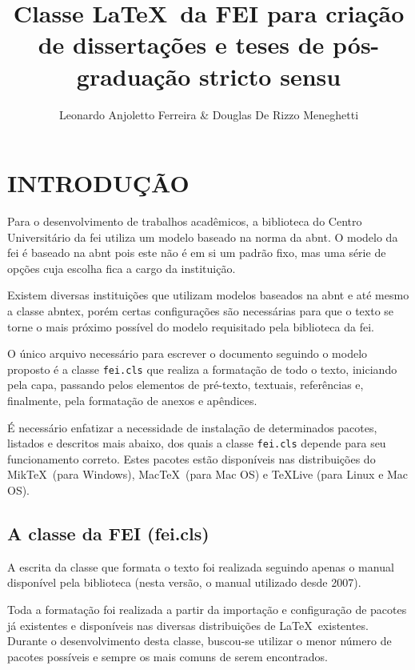 \documentclass{fei}
\author{Leonardo Anjoletto Ferreira \& Douglas De Rizzo Meneghetti}
\title{Classe \LaTeX~da FEI para criação de dissertações e teses de pós-graduação stricto sensu}
\begin{document}

\maketitle
\printglossaries
\sumario

\chapter{INTRODUÇÃO}

Para o desenvolvimento de trabalhos acadêmicos, a biblioteca do Centro Universitário da \gls{fei} utiliza um modelo baseado na norma da \gls{abnt}. O modelo da \gls{fei} é baseado na \gls{abnt} pois este não é em si um padrão fixo, mas uma série de opções cuja escolha fica a cargo da instituição.

Existem diversas instituições que utilizam modelos baseados na \gls{abnt} e até mesmo a classe \gls{abntex}, porém certas configurações são necessárias para que o texto se torne o mais próximo possível do modelo requisitado pela biblioteca da \gls{fei}.

O único arquivo necessário para escrever o documento seguindo o modelo proposto é a classe \texttt{fei.cls} que realiza a formatação de todo o texto, iniciando pela capa, passando pelos elementos de pré-texto, textuais, referências e, finalmente, pela formatação de anexos e apêndices.

É necessário enfatizar a necessidade de instalação de determinados pacotes, listados e descritos mais abaixo, dos quais a classe \texttt{fei.cls} depende para seu funcionamento correto. Estes pacotes estão disponíveis nas distribuições do Mik\TeX~(para Windows), Mac\TeX~(para Mac OS) e \TeX Live (para Linux e Mac OS).

\section{A classe da FEI (fei.cls)}

A escrita da classe que formata o texto foi realizada seguindo apenas o manual disponível pela biblioteca (nesta versão, o manual utilizado desde 2007).

Toda a formatação foi realizada a partir da importação e configuração de pacotes já existentes e disponíveis nas diversas distribuições de \index{\LaTeX}\LaTeX~existentes. Durante o desenvolvimento desta classe, buscou-se utilizar o menor número de pacotes possíveis e sempre os mais comuns de serem encontrados.
\end{document}
